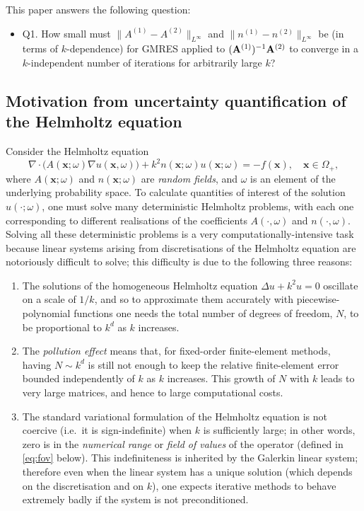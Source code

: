 \documentclass[10pt]{article}%
\numberwithin{equation}{section}
\newcommand{\beqs}{\begin{equation*}}
\newcommand{\eeqs}{\end{equation*}}
\newcommand{\bit}{\begin{itemize}}
\newcommand{\eit}{\end{itemize}}
\newcommand{\bx}{\mathbf{x}}
\newcommand{\Oe}{{\Omega_+}}
\newcommand{\matrixA}{{\bf A}}
\newcommand{\coeffA}{A}
\newcommand{\coeffn}{n}
\newcommand{\coeffAo}{A^{(1)}}
\newcommand{\coeffAt}{A^{(2)}}
\newcommand{\coeffno}{n^{(1)}}
\newcommand{\coeffnt}{n^{(2)}}
\begin{document}
This paper answers the following question:

\bit
\item[Q1.] How small must $\|\coeffAo - \coeffAt\|_{L^\infty}$ and 
$\|\coeffno - \coeffnt\|_{L^\infty}$ be (in terms of $k$-dependence) for GMRES 
applied to $(\matrixA^{(1)})^{-1}\matrixA^{(2)}$ to converge in a $k$-independent number of iterations
 for arbitrarily large $k$? 
\eit

\subsection{Motivation from uncertainty quantification of the Helmholtz equation} 
Consider the Helmholtz equation 
\beqs%
\nabla\cdot\big(\coeffA(\bx;\omega) \nabla u(\bx,\omega) \big) + k^2 \coeffn(\bx;\omega) u(\bx;\omega) =-f(\bx), \quad \bx\in\Oe,
\eeqs
where $\coeffA(\bx;\omega)$ and $\coeffn(\bx;\omega)$ are \emph{random fields}, and $\omega$ is an element of the underlying probability space.
To calculate quantities of interest of the solution $u(\cdot;\omega)$, one must solve many deterministic Helmholtz problems, with each one corresponding to different realisations of the coefficients $A(\cdot,\omega)$ and $n(\cdot,\omega)$.
Solving all these deterministic problems is a very computationally-intensive task because linear systems arising from discretisations of the Helmholtz equation are notoriously difficult to solve; this difficulty is due to the following three reasons:
\begin{enumerate}
\item 
The solutions of the homogeneous Helmholtz equation $\Delta u +k^2 u=0$ oscillate on a scale of $1/k$, and so to approximate them accurately with piecewise-polynomial functions one needs the total number of degrees of freedom, $N$, to be proportional to $k^d$ as $k$ increases.
\item The \emph{pollution effect} means that, for fixed-order finite-element methods, having $N\sim k^d$ is still not enough to keep the relative finite-element error bounded independently of $k$ as $k$ increases. This growth of $N$ with $k$ leads to very large matrices, and hence to large computational costs.
\item 
The standard variational formulation of the Helmholtz equation is not coercive (i.e.~it is sign-indefinite) when $k$ is sufficiently large; in other words, zero is in the \emph{numerical range} or \emph{field of values} of the operator (defined in \eqref{eq:fov} below). This indefiniteness is inherited by the Galerkin linear system; therefore 
even when the linear system has a unique solution (which depends on the discretisation and on $k$), one expects iterative methods to behave extremely badly if the system is not preconditioned.
\end{enumerate}
\end{document}
